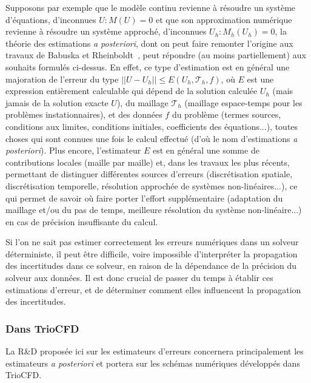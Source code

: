 Supposons par exemple que le mod\`ele continu revienne \`a r\'esoudre un syst\`eme d'\'equations, d'inconnues $U : M(U) = 0$ et que son approximation num\'erique revienne \`a r\'esoudre un syst\`eme approch\'e, d'inconnues $U_h : M_h(U_h) = 0$, la th\'eorie des estimations {\it a posteriori}, dont on peut faire remonter l'origine aux travaux de Babuska et Rheinboldt~\cite{Babuska1,Babuska2}, peut r\'epondre (au moins partiellement) aux souhaits formul\'es ci-dessus. En effet, ce type d'estimation est en g\'en\'eral une majoration de l'erreur du type $ \vert\vert  U - U_h\vert \vert \leq E(U_h, \mathcal T_h, f)$, o\`u $ E$ est une expression enti\`erement calculable qui d\'epend de la solution calcul\'ee $ U_h$  (mais jamais de la solution exacte $U$), du maillage $\mathcal T _h$ (maillage espace-temps pour les probl\`emes instationnaires), et des donn\'ees $f$ du probl\`eme (termes sources, conditions aux limites, conditions initiales, coefficients des \'equations...), toutes choses qui sont connues une fois le calcul effectu\'e (d'o\`u le nom d'estimations {\it a posteriori}). Plus encore, l'estimateur $E$ est en g\'en\'eral une somme de contributions locales (maille par maille) et, dans les travaux les plus r\'ecents, permettant de distinguer diff\'erentes sources d'erreurs (discr\'etisation spatiale, discr\'etisation temporelle, r\'esolution approch\'ee de syst\`emes non-lin\'eaires...), ce qui permet de savoir o\`u faire porter l'effort suppl\'ementaire (adaptation du maillage et/ou du pas de temps, meilleure r\'esolution du syst\`eme non-lin\'eaire...) en cas de pr\'ecision insuffisante du calcul. \\


\begin{rque}
Si l'on ne sait pas estimer correctement les erreurs num\'eriques dans un solveur d\'eterministe, il peut \^etre difficile, voire impossible d'interpr\'eter la propagation des incertitudes dans ce solveur, en raison de la d\'ependance de la pr\'ecision du solveur aux donn\'ees. Il est donc crucial de passer du temps \`a \'etablir ces estimations d'erreur, et de d\'eterminer comment elles influencent la propagation des incertitudes.  
\end{rque}

\subsubsection{Dans TrioCFD}

La R\&D propos\'ee ici sur les estimateurs d'erreurs concernera principalement  les estimateurs {\it a posteriori} et portera sur les sch\'emas num\'eriques d\'evelopp\'es dans TrioCFD.


